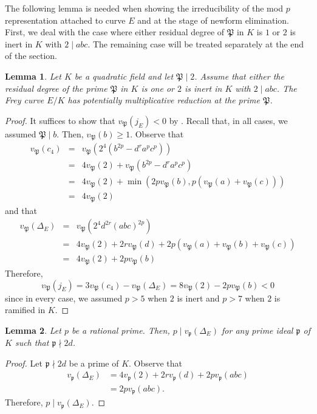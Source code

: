 \documentclass[]{article}
\newtheorem{lemma}{Lemma}
\newcommand {\mfp}{{\mathfrak{P}}}
\newcounter{cases}
\begin{document}
The following lemma is needed when showing the irreducibility of the mod $p$ representation attached to curve $E$ and at the stage of newform elimination. First, we deal with the case where either residual degree of $\mfp$ in $K$ is $1$ or $2$ is inert in $K$ with $2\mid abc$. The remaining case will be treated separately at the end of the section.

\begin{lemma}\label{potmultb}
Let $K$ be a quadratic field and let $\mfp\mid 2$. Assume that either the residual degree of the prime $\mfp$ in $K$ is one or $2$ is inert in $K$ with $2\mid abc$. The Frey curve $E/K$ has potentially multiplicative reduction at the prime $\mfp$.
\end{lemma}

\begin{proof}
    It suffices to show that $v_{\mfp}(j_E)<0$ by \cite[Proposition VII.5.5]{silverman2009arithmetic}. Recall that, in all cases, we assumed $\mfp\mid b$. Then, $v_{\mfp}(b)\ge1$. Observe that 
    \begin{eqnarray*}
    v_{\mfp}(c_4)&=&v_{\mfp}(2^4(b^{2p}-d^ra^pc^p))\\
    &=&4v_{\mfp}(2)+v_{\mfp}(b^{2p}-d^ra^pc^p)\\
    &=&4v_{\mfp}(2)+\min(2pv_{\mfp}(b), p(v_{\mfp}(a)+v_{\mfp}(c)))\\
    &=&4v_{\mfp}(2)
\end{eqnarray*}and that
    \begin{eqnarray*}
    v_{\mfp}(\Delta_E)&=& v_{\mfp}(2^4d^{2r}(abc)^{2p})\\
    &=&4v_{\mfp}(2)+2rv_{\mfp}(d)+2p(v_{\mfp}(a)+v_{\mfp}(b)+v_{\mfp}(c))\\
    &=&4v_{\mfp}(2)+2pv_{\mfp}(b)
    \end{eqnarray*}Therefore,$$v_{\mfp}(j_E)=3v_{\mfp}(c_4)-v_{\mfp}(\Delta_E)=8v_{\mfp}(2)-2pv_{\mfp}(b)<0$$since in every case, we assumed $p> 5$ when $2$ is inert and $p>7$ when $2$ is ramified in $K$.
\end{proof}

\begin{lemma}\label{pdivdel}
Let $p$ be a rational prime. Then, $p\mid v_{\mathfrak{p}}(\Delta_E)$ for any prime ideal $\mathfrak{p}$ of $K$ such that $\mathfrak{p}\nmid 2d$.    
\end{lemma}

\begin{proof}
    Let $\mathfrak{p}\nmid 2d$ be a prime of $K$. Observe that 
    \begin{align*}
      v_{\mathfrak{p}}(\Delta_E)&=4v_{\mathfrak{p}}(2)+2rv_{\mathfrak{p}}(d)+2pv_{\mathfrak{p}}(abc)\\
      &=2pv_{\mathfrak{p}}(abc).
    \end{align*}Therefore, $p\mid v_{\mathfrak{p}}(\Delta_E)$.
\end{proof}
\end{document}
